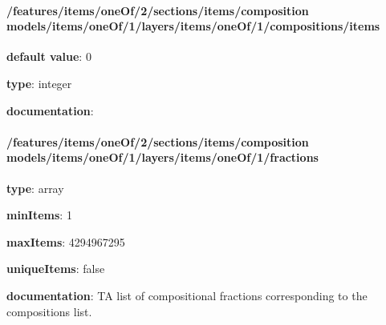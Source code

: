 \begin{itemized}
\paragraph{/features/items/oneOf/2/sections/items/composition models/items/oneOf/1/layers/items/oneOf/1/compositions/items} \begin{itemized}
\item {\bf default value}: 0
\item {\bf type}: integer
\item {\bf documentation}: 
\end{itemized}\end{itemized}\paragraph{/features/items/oneOf/2/sections/items/composition models/items/oneOf/1/layers/items/oneOf/1/fractions} \begin{itemized}
\item {\bf type}: array
\item {\bf minItems}: 1
\item {\bf maxItems}: 4294967295
\item {\bf uniqueItems}: false
\item {\bf documentation}: TA list of compositional fractions corresponding to the compositions list.

\end{itemized}
